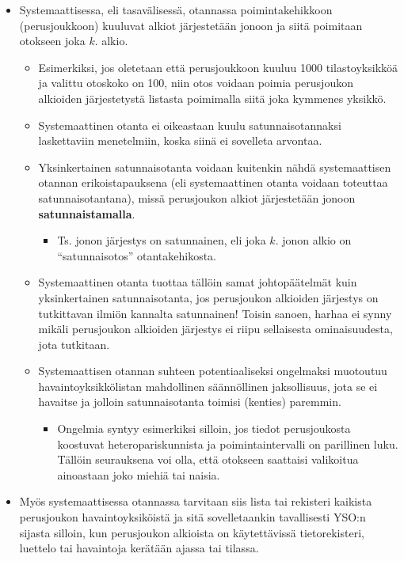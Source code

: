 \documentclass[
]{book}
\providecommand{\tightlist}{%
  \setlength{\itemsep}{0pt}\setlength{\parskip}{0pt}}
\begin{document}
\begin{itemize}
\tightlist
\item
  Systemaattisessa, eli tasavälisessä, otannassa poimintakehikkoon (perusjoukkoon) kuuluvat alkiot järjestetään jonoon ja siitä poimitaan otokseen joka \(k\). alkio.

  \begin{itemize}
  \tightlist
  \item
    Esimerkiksi, jos oletetaan että perusjoukkoon kuuluu 1000 tilastoyksikköä ja valittu otoskoko on 100, niin otos voidaan poimia perusjoukon alkioiden järjestetystä listasta poimimalla siitä joka kymmenes yksikkö.
  \item
    Systemaattinen otanta ei oikeastaan kuulu satunnaisotannaksi laskettaviin menetelmiin, koska siinä ei sovelleta arvontaa.
  \item
    Yksinkertainen satunnaisotanta voidaan kuitenkin nähdä systemaattisen otannan erikoistapauksena (eli systemaattinen otanta voidaan toteuttaa satunnaisotantana), missä perusjoukon alkiot järjestetään jonoon \textbf{satunnaistamalla}.

    \begin{itemize}
    \tightlist
    \item
      Ts. jonon järjestys on satunnainen, eli joka \(k\). jonon alkio on ``satunnaisotos'' otantakehikosta.
    \end{itemize}
  \item
    Systemaattinen otanta tuottaa tällöin samat johtopäätelmät kuin yksinkertainen satunnaisotanta, jos perusjoukon alkioiden järjestys on tutkittavan ilmiön kannalta satunnainen! Toisin sanoen, harhaa ei synny mikäli perusjoukon alkioiden järjestys ei riipu sellaisesta ominaisuudesta, jota tutkitaan.
  \item
    Systemaattisen otannan suhteen potentiaaliseksi ongelmaksi muotoutuu havaintoyksikkölistan mahdollinen säännöllinen jaksollisuus, jota se ei havaitse ja jolloin satunnaisotanta toimisi (kenties) paremmin.

    \begin{itemize}
    \tightlist
    \item
      Ongelmia syntyy esimerkiksi silloin, jos tiedot perusjoukosta koostuvat heteropariskunnista ja poimintaintervalli on parillinen luku. Tällöin seurauksena voi olla, että otokseen saattaisi valikoitua ainoastaan joko miehiä tai naisia.
    \end{itemize}
  \end{itemize}
\item
  Myös systemaattisessa otannassa tarvitaan siis lista tai rekisteri kaikista perusjoukon havaintoyksiköistä ja sitä sovelletaankin tavallisesti YSO:n sijasta silloin, kun perusjoukon alkioista on käytettävissä tietorekisteri, luettelo tai havaintoja kerätään ajassa tai tilassa.


\end{itemize}
\end{document}
